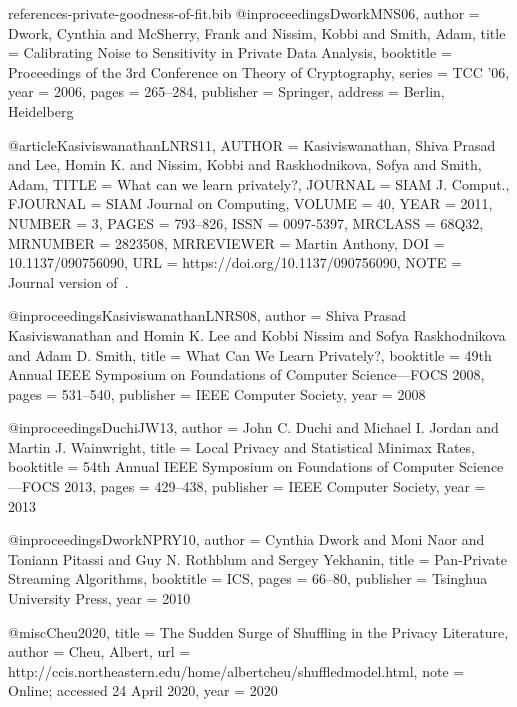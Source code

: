 \documentclass[10pt]{article}
\begin{document}
\begin{filecontents}{references-private-goodness-of-fit.bib}
@inproceedings{DworkMNS06,
  author        = {Dwork, Cynthia and McSherry, Frank and Nissim, Kobbi and Smith, Adam},
  title         = {Calibrating Noise to Sensitivity in Private Data Analysis},
  booktitle     = {Proceedings of the 3rd Conference on Theory of Cryptography},
  series        = {TCC '06},
  year          = {2006},
  pages         = {265--284},
  publisher     = {Springer},
  address       = {Berlin, Heidelberg}
}


@article{KasiviswanathanLNRS11,
    AUTHOR = {Kasiviswanathan, Shiva Prasad and Lee, Homin K. and Nissim,
              Kobbi and Raskhodnikova, Sofya and Smith, Adam},
     TITLE = {What can we learn privately?},
   JOURNAL = {SIAM J. Comput.},
  FJOURNAL = {SIAM Journal on Computing},
    VOLUME = {40},
      YEAR = {2011},
    NUMBER = {3},
     PAGES = {793--826},
      ISSN = {0097-5397},
   MRCLASS = {68Q32},
  MRNUMBER = {2823508},
MRREVIEWER = {Martin Anthony},
       DOI = {10.1137/090756090},
       URL = {https://doi.org/10.1137/090756090},
      NOTE = {Journal version of~\cite{KasiviswanathanLNRS08}.}
}

@inproceedings{KasiviswanathanLNRS08,
  author    = {Shiva Prasad Kasiviswanathan and
               Homin K. Lee and
               Kobbi Nissim and
               Sofya Raskhodnikova and
               Adam D. Smith},
  title     = {What Can We Learn Privately?},
  booktitle = {49th Annual IEEE Symposium on Foundations of Computer Science---{FOCS} 2008}, 
  pages     = {531--540},
  publisher = {{IEEE} Computer Society},
  year      = {2008}
}

@inproceedings{DuchiJW13,
  author    = {John C. Duchi and
               Michael I. Jordan and
               Martin J. Wainwright},
  title     = {Local Privacy and Statistical Minimax Rates},
  booktitle = {54th Annual IEEE Symposium on Foundations of Computer Science---{FOCS} 2013}, 
  pages     = {429--438},
  publisher = {{IEEE} Computer Society},
  year      = {2013}
}

@inproceedings{DworkNPRY10,
  author    = {Cynthia Dwork and
               Moni Naor and
               Toniann Pitassi and
               Guy N. Rothblum and
               Sergey Yekhanin},
  title     = {Pan-Private Streaming Algorithms},
  booktitle = {{ICS}},
  pages     = {66--80},
  publisher = {Tsinghua University Press},
  year      = {2010}
}

@misc{Cheu2020,
     title = {{The Sudden Surge of Shuffling in the Privacy Literature}},
    author = {Cheu, Albert},
    url    = {http://ccis.northeastern.edu/home/albertcheu/shuffledmodel.html},
    note   = {Online; accessed 24 April 2020}, 
    year   = {2020}
}


\end{filecontents}
\end{document}
